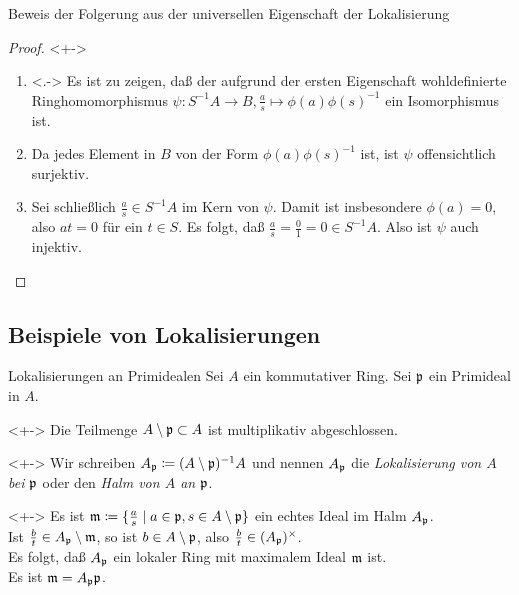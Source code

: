 \begin{frame}{Beweis der Folgerung aus der universellen Eigenschaft der Lokalisierung}
	\begin{proof}<+->
		\begin{enumerate}[<+->]
		\item<.->
			Es ist zu zeigen, daß der aufgrund der ersten Eigenschaft wohldefinierte Ringhomomorphismus
			\(\psi\colon S^{-1} A \to B, \frac a s \mapsto \phi(a)\phi(s)^{-1}\) ein Isomorphismus ist.
		\item
			Da jedes Element in \(B\) von der Form \(\phi(a)\phi(s)^{-1}\) ist, ist \(\psi\) offensichtlich surjektiv.
		\item
			Sei schließlich \(\frac a s \in S^{-1} A\) im Kern von \(\psi\). Damit ist insbesondere \(\phi(a) = 0\), also
			\(a t = 0\) für ein \(t \in S\). Es folgt, daß \(\frac a s = \frac 0 1 = 0 \in S^{-1} A\). Also ist \(\psi\) auch
			injektiv.
			\qedhere
		\end{enumerate}
	\end{proof}
\end{frame}

\subsection{Beispiele von Lokalisierungen}

\begin{frame}{Lokalisierungen an Primidealen}
	Sei \(A\) ein kommutativer Ring. Sei \(\mathfrak{p}\) ein Primideal in \(A\).
	\begin{example}<+->
		Die Teilmenge \(A \setminus \mathfrak{p} \subset A\) ist multiplikativ abgeschlossen.
	\end{example}
	\begin{notation}<+->
		Wir schreiben \(A_{\mathfrak{p}} \coloneqq (A \setminus \mathfrak{p})^{-1} A\) und nennen \(A_{\mathfrak{p}}\) die
		\emph{Lokalisierung von \(A\) bei \(\mathfrak{p}\)} oder den \emph{Halm von \(A\) an \(\mathfrak{p}\)}.
	\end{notation}
	\begin{example}<+->
		Es ist \(\mathfrak{m} \coloneqq \{\frac a s \mid a \in \mathfrak{p}, s \in A \setminus \mathfrak{p}\}\) ein echtes
		Ideal im Halm \(A_{\mathfrak{p}}\).
		\\
		Ist \(\frac b t \in A_{\mathfrak{p}} \setminus \mathfrak{m}\), so ist \(b \in A \setminus \mathfrak{p}\),
		also \(\frac b t \in (A_{\mathfrak{p}})^\times\).
		\\
		Es folgt, daß \(A_{\mathfrak{p}}\) ein lokaler Ring mit maximalem Ideal \(\mathfrak{m}\) ist.
		\\
		Es ist \(\mathfrak{m} = A_{\mathfrak{p}} \mathfrak{p}\).
	\end{example}
\end{frame}

